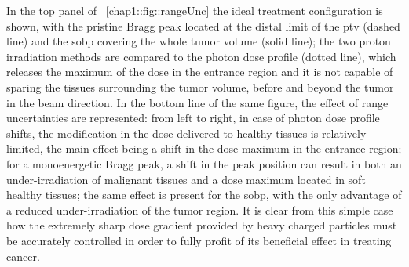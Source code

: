 In the top panel of \figurename~\ref{chap1::fig::rangeUnc} the ideal treatment configuration is shown, with the pristine Bragg peak located at the distal limit of the \gls{ptv} (dashed line) and the \gls{sobp} covering the whole tumor volume (solid line); the two proton irradiation methods are compared to the photon dose profile (dotted line), which releases the maximum of the dose in the entrance region and it is not capable of sparing the tissues surrounding the tumor volume, before and beyond the tumor in the beam direction. In the bottom line of the same figure, the effect of range uncertainties are represented: from left to right, in case of photon dose profile shifts, the modification in the dose delivered to healthy tissues is relatively limited, the main effect being a shift in the dose maximum in the entrance region; for a monoenergetic Bragg peak, a shift in the peak position can result in both an under-irradiation of malignant tissues and a dose maximum located in soft healthy tissues; the same effect is present for the \gls{sobp}, with the only advantage of a reduced under-irradiation of the tumor region. It is clear from this simple case how the extremely sharp dose gradient provided by heavy charged particles must be accurately controlled in order to fully profit of its beneficial effect in treating cancer. 
